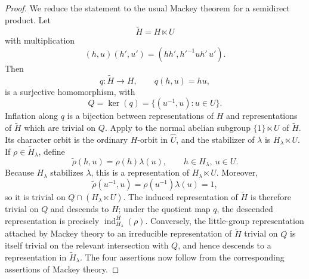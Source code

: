 \documentclass[11pt,a4paper,twoside]{amsart}
\theoremstyle{definition}
\theoremstyle{remark}
\newcommand{\bl}{\lambda}
\newcommand{\ind}{\operatorname{ind}}
\begin{document}
\begin{proof}
We reduce the statement to the usual Mackey theorem for a semidirect product. Let
$$
\widetilde H=H\ltimes U
$$
with multiplication
$$
(h,u)(h',u')=(hh',h'^{-1}uh'\,u').
$$
Then
$$
q:\widetilde H\longrightarrow H,\qquad q(h,u)=hu,
$$
is a surjective homomorphism, with
$$
Q=\ker(q)=\{(u^{-1},u):u\in U\}.
$$
Inflation along $q$ is a bijection between representations of $H$ and representations of $\widetilde H$ which are trivial on $Q$.
Apply \cite[Theorem~2]{H} to the normal abelian subgroup $\{1\}\ltimes U$ of $\widetilde H$. Its character orbit is the ordinary $H$-orbit in $\widehat U$, and the stabilizer of $\bl$ is $H_\bl\ltimes U$. If $\rho\in\widetilde H_\bl$, define
$$
\widetilde\rho(h,u)=\rho(h)\bl(u),\qquad h\in H_\bl,\ u\in U.
$$
Because $H_\bl$ stabilizes $\bl$, this is a representation of $H_\bl\ltimes U$. Moreover,
$$
\widetilde\rho(u^{-1},u)=\rho(u^{-1})\bl(u)=1,
$$
so it is trivial on $Q\cap(H_\bl\ltimes U)$. The induced representation of $\widetilde H$ is therefore trivial on $Q$ and descends to $H$; under the quotient map $q$, the descended representation is precisely $\ind_{H_\bl}^H(\rho)$. Conversely, the little-group representation attached by Mackey theory to an irreducible representation of $\widetilde H$ trivial on $Q$ is itself trivial on the relevant intersection with $Q$, and hence descends to a representation in $\widetilde H_\bl$. The four assertions now follow from the corresponding assertions of Mackey theory.
\end{proof}
\end{document}
